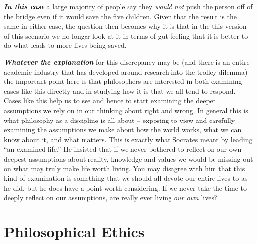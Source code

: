 \documentclass[
  12pt, openany]{book}
\begin{document}
\textbf{\emph{In this case}} a large majority of people say they \emph{would not} push the person off of the bridge even if it would save the five children. Given that the result is the same in either case, the question then becomes why it is that in the this version of this scenario we no longer look at it in terms of gut feeling that it is better to do what leads to more lives being saved.

\textbf{\emph{Whatever the explanation}} for this discrepancy may be (and there is an entire academic industry that has developed around research into the trolley dilemma) the important point here is that philosophers are interested in both examining cases like this directly and in studying how it is that we all tend to respond. Cases like this help us to see and hence to start examining the deeper assumptions we rely on in our thinking about right and wrong. In general this is what philosophy as a discipline is all about -- exposing to view and carefully examining the assumptions we make about how the world works, what we can know about it, and what matters. This is exactly what Socrates meant by leading ``an examined life.'' He insisted that if we never bothered to reflect on our own deepest assumptions about reality, knowledge and values we would be missing out on what may truly make life worth living. You may disagree with him that this kind of examination is something that we should all devote our entire lives to as he did, but he does have a point worth considering. If we never take the time to deeply reflect on our assumptions, are really ever living \emph{our own} lives?

\hypertarget{philosophical-ethics}{%
\section{Philosophical Ethics}\label{philosophical-ethics}}
\end{document}
